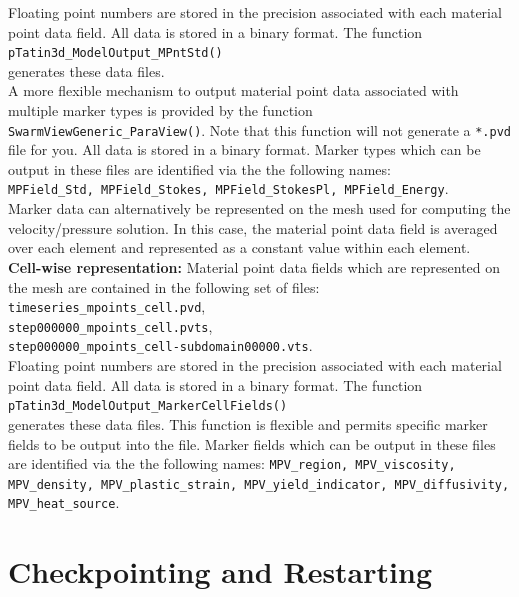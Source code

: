 \documentclass[paper=a4, fontsize=10pt,twoside]{scrartcl}
\newcommand{\unix}[1]{\texttt{\footnotesize #1}}
\begin{document}
Floating point numbers are stored in the precision associated with each material point data field. All data is stored in a binary format. The function \\
\unix{pTatin3d\_ModelOutput\_MPntStd()} \\
generates these data files.
\\[8pt]
A more flexible mechanism to output material point data associated with multiple marker types is provided by the function \unix{SwarmViewGeneric\_ParaView()}. Note that this function will not generate a \texttt{*.pvd} file for you.  All data is stored in a binary format. Marker types which can be output in these files are identified via the the following names: \\
\unix{MPField\_Std, MPField\_Stokes, MPField\_StokesPl, MPField\_Energy}.
\\[8pt]
Marker data can alternatively be represented on the mesh used for computing the velocity/pressure solution. 
In this case, the material point data field is averaged over each element and represented as a constant value within each element.
\\[8pt]
{\bf Cell-wise representation:} Material point data fields which are represented on the mesh are contained in the following set of files:\\
\unix{timeseries\_mpoints\_cell.pvd}, \\
\unix{step000000\_mpoints\_cell.pvts}, \\
\unix{step000000\_mpoints\_cell-subdomain00000.vts}. \\
Floating point numbers are stored in the precision associated with each material point data field. All data is stored in a binary format.
The function \\
	\unix{pTatin3d\_ModelOutput\_MarkerCellFields()} \\
generates these data files. This function is flexible and permits specific marker fields to be output into the file. Marker fields which can be output in these files are identified via the the following names:
\unix{MPV\_region, MPV\_viscosity, MPV\_density, MPV\_plastic\_strain, MPV\_yield\_indicator, MPV\_diffusivity, MPV\_heat\_source}.

\section{Checkpointing and Restarting} \label{sec:checkpoint}
\end{document}
